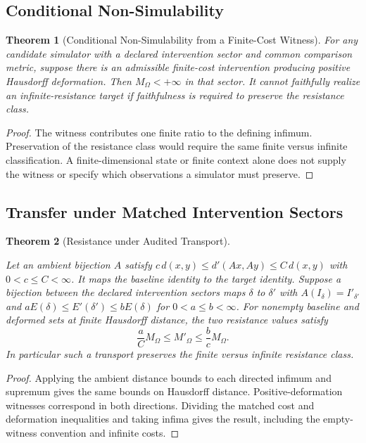 \documentclass[11pt,a4paper]{article}
\theoremstyle{plain}
\newtheorem{theorem}{Theorem}[section]
\theoremstyle{definition}
\theoremstyle{remark}
\begin{document}
\subsection{Conditional Non-Simulability}

\begin{theorem}[Conditional Non-Simulability from a Finite-Cost Witness]\label{thm:non-simulability}
For any candidate simulator with a declared intervention sector and common comparison metric, suppose there is an admissible finite-cost intervention producing positive Hausdorff deformation. Then $M_\Omega<+\infty$ in that sector. It cannot faithfully realize an infinite-resistance target if faithfulness is required to preserve the resistance class.
\end{theorem}
\begin{proof}
The witness contributes one finite ratio to the defining infimum. Preservation of the resistance class would require the same finite versus infinite classification. A finite-dimensional state or finite context alone does not supply the witness or specify which observations a simulator must preserve.
\end{proof}

\subsection{Transfer under Matched Intervention Sectors}

\begin{theorem}[Resistance under Audited Transport]\label{thm:non-transferability}\leavevmode\par
Let an ambient bijection $A$ satisfy $c\,d(x,y)\leq d'(Ax,Ay)\leq C\,d(x,y)$ with $0<c\leq C<\infty$. It maps the baseline identity to the target identity. Suppose a bijection between the declared intervention sectors maps $\delta$ to $\delta'$ with $A(I_\delta)=I'_{\delta'}$ and $a E(\delta)\leq E'(\delta')\leq b E(\delta)$ for $0<a\leq b<\infty$. For nonempty baseline and deformed sets at finite Hausdorff distance, the two resistance values satisfy
\[
 \frac{a}{C}M_\Omega\leq M'_\Omega\leq\frac{b}{c}M_\Omega.
\]
In particular such a transport preserves the finite versus infinite resistance class.
\end{theorem}
\begin{proof}
Applying the ambient distance bounds to each directed infimum and supremum gives the same bounds on Hausdorff distance. Positive-deformation witnesses correspond in both directions. Dividing the matched cost and deformation inequalities and taking infima gives the result, including the empty-witness convention and infinite costs.
\end{proof}
\end{document}
